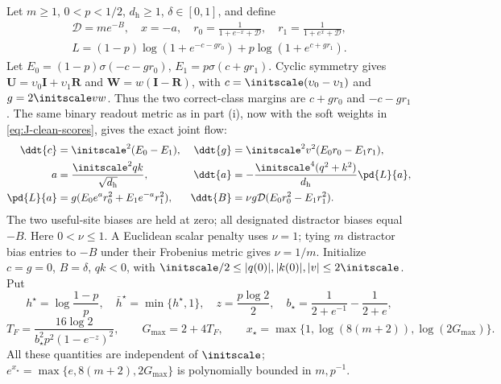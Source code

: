 Let $m\ge1$, $0<p<1/2$, $d_{\mathrm h}\ge1$, $\delta\in[0,1]$, and define
\[
 \begin{gathered}
 \mathcal D=me^{-B},\quad x=-a,\quad
 r_0=\frac1{1+e^{-x}+\mathcal D},\quad r_1=\frac1{1+e^x+\mathcal D},\\
 L=(1-p)\log(1+e^{-c-gr_0})+p\log(1+e^{c+gr_1}).
 \end{gathered}
\]
Let $E_0=(1-p)\sigma(-c-gr_0)$, $E_1=p\sigma(c+gr_1)$.
Cyclic symmetry gives $\mathbf U=\upsilon_0\mathbf I+\upsilon_1\mathbf R$ and $\mathbf W=w(\mathbf I-\mathbf R)$, with
$c=\initscale(\upsilon_0-\upsilon_1)$ and $g=2\initscale vw$. Thus the two correct-class margins are $c+gr_0$ and $-c-gr_1$.
The same binary readout metric as in part (i), now with the soft weights in \cref{eq:J-clean-scores}, gives the exact joint flow:
\begin{align*}
 \ddt{c}&=\initscale^2(E_0-E_1),&
 \ddt{g}&=\initscale^2v^2(E_0r_0-E_1r_1),\\
 a&=\frac{\initscale^2qk}{\sqrt{d_{\mathrm h}}},&
 \ddt{a}&=-\frac{\initscale^4(q^2+k^2)}{d_{\mathrm h}}\pd{L}{a},\\
 \pd{L}{a}&=g(E_0e^a r_0^2+E_1e^{-a}r_1^2),&
 \ddt{B}&=\nu g\mathcal D(E_0r_0^2-E_1r_1^2).
\end{align*}
The two useful-site biases are held at zero; all designated distractor biases equal $-B$.
Here $0<\nu\le1$. A Euclidean scalar penalty uses $\nu=1$; tying $m$ distractor bias entries to $-B$ under their Frobenius metric gives $\nu=1/m$.
Initialize $c=g=0$, $B=\delta$, $qk<0$, with
$\initscale/2\le |q(0)|,|k(0)|,|v|\le2\initscale$.
Put
\begin{equation}
 h^\star=\log\frac{1-p}{p},\quad \bar h^\star=\min\{h^\star,1\},\quad
 z=\frac{p\log2}{2},\quad
 b_\star=\frac1{2+e^{-1}}-\frac1{2+e},
\end{equation}
\begin{equation}
 T_F=\frac{16\log2}{b_\star^2p^2(1-e^{-z})^2},\qquad
 G_{\max}=2+4T_F,\qquad x_\star=\max\{1,\log(8(m+2)),\log(2G_{\max})\}.
 \label{eq:CR-constants}
\end{equation}
All these quantities are independent of $\initscale$; $e^{x_\star}=\max\{e,8(m+2),2G_{\max}\}$ is polynomially bounded in $m,p^{-1}$.

